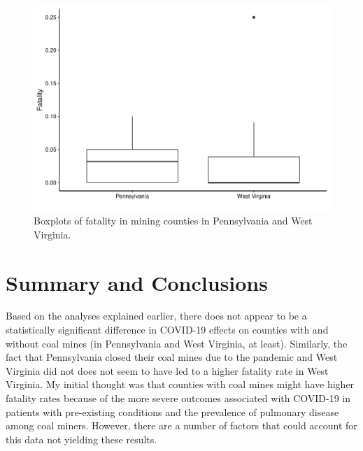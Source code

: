 \documentclass[
  12pt,
]{article}
\begin{document}
\begin{figure}
\centering
\includegraphics{Hancock_ENV872_Project_files/figure-latex/PA-WV_Boxplots-1.pdf}
\caption{Boxplots of fatality in mining counties in Pennsylvania and
West Virginia.}
\end{figure}

\newpage

\hypertarget{summary-and-conclusions}{%
\section{Summary and Conclusions}\label{summary-and-conclusions}}

Based on the analyses explained earlier, there does not appear to be a
statistically significant difference in COVID-19 effects on counties
with and without coal mines (in Pennsylvania and West Virginia, at
least). Similarly, the fact that Pennsylvania closed their coal mines
due to the pandemic and West Virginia did not does not seem to have led
to a higher fatality rate in West Virginia. My initial thought was that
counties with coal mines might have higher fatality rates because of the
more severe outcomes associated with COVID-19 in patients with
pre-existing conditions and the prevalence of pulmonary disease among
coal miners. However, there are a number of factors that could account
for this data not yielding these results.
\end{document}
